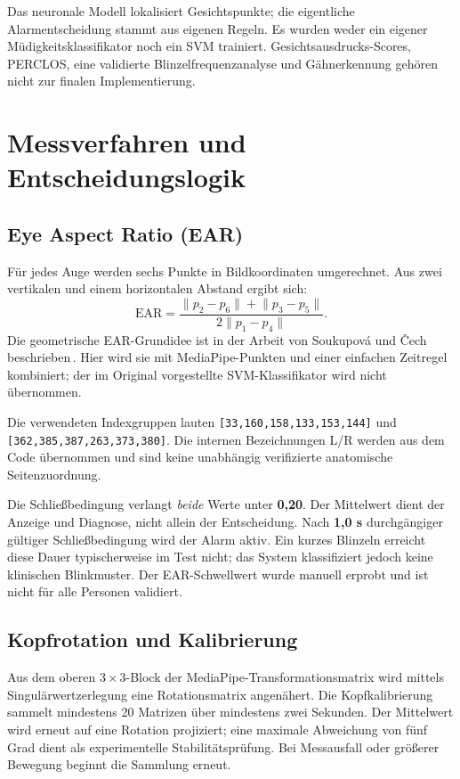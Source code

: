 \documentclass[11pt,a4paper]{article}
\newcommand{\code}[1]{{\small\nolinkurl{#1}}}
\begin{document}
Das neuronale Modell lokalisiert Gesichtspunkte; die eigentliche Alarmentscheidung stammt aus eigenen Regeln. Es wurden weder ein eigener Müdigkeitsklassifikator noch ein SVM trainiert. Gesichtsausdrucks-Scores, PERCLOS, eine validierte Blinzelfrequenzanalyse und Gähnerkennung gehören nicht zur finalen Implementierung.
\newpage
\section{Messverfahren und Entscheidungslogik}
\subsection*{Eye Aspect Ratio (EAR)}
Für jedes Auge werden sechs Punkte in Bildkoordinaten umgerechnet. Aus zwei vertikalen und einem horizontalen Abstand ergibt sich:
\begin{equation}
\mathrm{EAR}=\frac{\lVert p_2-p_6\rVert+\lVert p_3-p_5\rVert}{2\lVert p_1-p_4\rVert}.
\end{equation}
Die geometrische EAR-Grundidee ist in der Arbeit von Soukupová und Čech beschrieben\,\cite{ear}. Hier wird sie mit MediaPipe-Punkten und einer einfachen Zeitregel kombiniert; der im Original vorgestellte SVM-Klassifikator wird nicht übernommen.

Die verwendeten Indexgruppen lauten \code{[33,160,158,133,153,144]} und \code{[362,385,387,263,373,380]}. Die internen Bezeichnungen L/R werden aus dem Code übernommen und sind keine unabhängig verifizierte anatomische Seitenzuordnung.

Die Schließbedingung verlangt \emph{beide} Werte unter \textbf{0,20}. Der Mittelwert dient der Anzeige und Diagnose, nicht allein der Entscheidung. Nach \textbf{1,0 s} durchgängiger gültiger Schließbedingung wird der Alarm aktiv. Ein kurzes Blinzeln erreicht diese Dauer typischerweise im Test nicht; das System klassifiziert jedoch keine klinischen Blinkmuster. Der EAR-Schwellwert wurde manuell erprobt und ist nicht für alle Personen validiert.
\subsection*{Kopfrotation und Kalibrierung}
Aus dem oberen $3\times3$-Block der MediaPipe-Transformationsmatrix wird mittels Singulärwertzerlegung eine Rotationsmatrix angenähert. Die Kopfkalibrierung sammelt mindestens 20 Matrizen über mindestens zwei Sekunden. Der Mittelwert wird erneut auf eine Rotation projiziert; eine maximale Abweichung von fünf Grad dient als experimentelle Stabilitätsprüfung. Bei Messausfall oder größerer Bewegung beginnt die Sammlung erneut.
\end{document}
